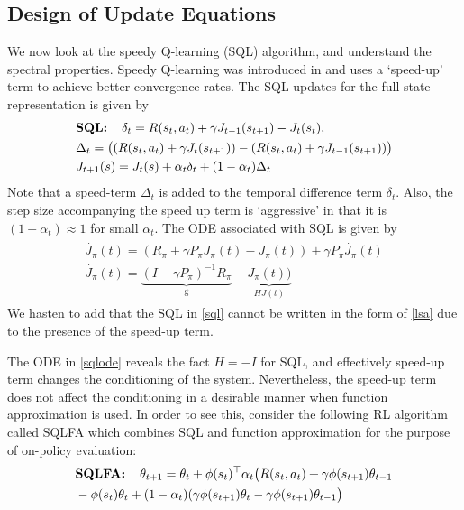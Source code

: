 \subsection{Design of Update Equations}


We now look at the speedy Q-learning (SQL) algorithm, and understand the spectral properties. Speedy Q-learning was introduced in \cite{} and uses a `speed-up' term to achieve better convergence rates. The SQL updates for the full state representation is given by
\begin{align}\label{sql}
\begin{split}
&\textbf{SQL:\quad}\delta_t=R(s_t,a_t)+\gamma J_{t-1}(s_{t+1})-J_{t}(s_t),\\
&\Delta_t= \big((R(s_t,a_t)+\gamma J_t(s_{t+1}))-(R(s_t,a_t)+\gamma J_{t-1}(s_{t+1}))\big)\\&J_{t+1}(s)=J_t(s)+\alpha_t\delta_t+(1-\alpha_t)\Delta_t
\end{split}
\end{align}
Note that a speed-term $\Delta_t$ is added to the temporal difference term $\delta_t$. Also, the step size accompanying the speed up term is `aggressive’ in that it is $(1-\alpha_t)\approx 1$ for small $\alpha_t$. The ODE associated with SQL is given by
\begin{align}
\begin{split}
\dot{J_\pi}(t)=(R_\pi+\gamma P_\pi J_\pi(t) -J_\pi(t))+\gamma P_\pi\dot{J_\pi}(t)\\
\dot{J_\pi}(t)=\underbrace{(I-\gamma P_\pi)^{-1}R_\pi}_{\text{g}}-\underbrace{J_\pi(t))}_{HJ(t)}
\end{split}
\end{align}
We hasten to add that the SQL in \eqref{sql} cannot be written in the form of \eqref{lsa} due to the presence of the speed-up term.\par 
The ODE in \eqref{sqlode} reveals the fact $H=-I$ for SQL, and effectively speed-up term changes the conditioning of the system. Nevertheless, the speed-up term does not affect the conditioning in a desirable manner when function approximation is used. In order to see this, consider the following RL algorithm called SQLFA which combines SQL and function approximation for the purpose of on-policy evaluation:
\begin{align}\label{sqlfa}
\begin{split}
&\textbf{SQLFA:\quad}\theta_{t+1}=\theta_t+\phi(s_t)^\top \alpha_t\big(R(s_t,a_t)+\gamma \phi(s_{t+1})\theta_{t-1}\\&-\phi(s_t)\theta_t +(1-\alpha_t)(\gamma \phi(s_{t+1})\theta_t-\gamma \phi(s_{t+1})\theta_{t-1}\big)
\end{split}
\end{align}

